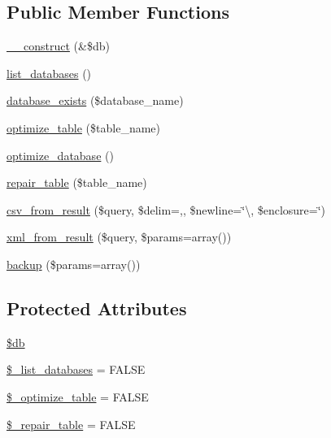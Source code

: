 \subsection*{Public Member Functions}
\begin{DoxyCompactItemize}
\item 
\mbox{\hyperlink{class_c_i___d_b__utility_aaf2ef772755ec6f361d44e16cc9ffd69}{\+\_\+\+\_\+construct}} (\&\$db)
\item 
\mbox{\hyperlink{class_c_i___d_b__utility_a8486b247a8868504b055622cb2dd34d3}{list\+\_\+databases}} ()
\item 
\mbox{\hyperlink{class_c_i___d_b__utility_ac0ba63aa14b19a37d4773fcc252bde81}{database\+\_\+exists}} (\$database\+\_\+name)
\item 
\mbox{\hyperlink{class_c_i___d_b__utility_a6aed9274f43b64eeee607d172b51529d}{optimize\+\_\+table}} (\$table\+\_\+name)
\item 
\mbox{\hyperlink{class_c_i___d_b__utility_acb26598e177f525b39978f6dfca1f212}{optimize\+\_\+database}} ()
\item 
\mbox{\hyperlink{class_c_i___d_b__utility_a41a627004d26198c69bf466eef7eaeeb}{repair\+\_\+table}} (\$table\+\_\+name)
\item 
\mbox{\hyperlink{class_c_i___d_b__utility_a5d7be38db559973f69188565fc98fd1b}{csv\+\_\+from\+\_\+result}} (\$query, \$delim=\textquotesingle{},\textquotesingle{}, \$newline=\char`\"{}\textbackslash{}, \$enclosure=\textquotesingle{}\char`\"{}\textquotesingle{})
\item 
\mbox{\hyperlink{class_c_i___d_b__utility_a09decb7db409060365ad2c20072523f9}{xml\+\_\+from\+\_\+result}} (\$query, \$params=array())
\item 
\mbox{\hyperlink{class_c_i___d_b__utility_abe2b9d47f950dfbaf8c6ec757a9af9a2}{backup}} (\$params=array())
\end{DoxyCompactItemize}
\subsection*{Protected Attributes}
\begin{DoxyCompactItemize}
\item 
\mbox{\hyperlink{class_c_i___d_b__utility_a1fa3127fc82f96b1436d871ef02be319}{\$db}}
\item 
\mbox{\hyperlink{class_c_i___d_b__utility_afe3a5b80562d93d6bc7e2b53c95b7e5a}{\$\+\_\+list\+\_\+databases}} = F\+A\+L\+SE
\item 
\mbox{\hyperlink{class_c_i___d_b__utility_a083199e5c22c78912dae0a47bb2d7fad}{\$\+\_\+optimize\+\_\+table}} = F\+A\+L\+SE
\item 
\mbox{\hyperlink{class_c_i___d_b__utility_a5cf925cbd52e3f6ba5b7ada3fa436efc}{\$\+\_\+repair\+\_\+table}} = F\+A\+L\+SE
\end{DoxyCompactItemize}


